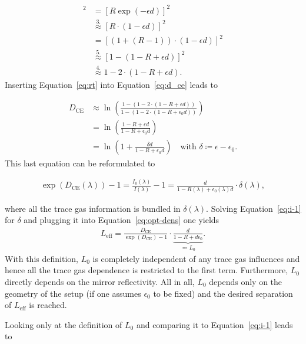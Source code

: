 \begin{align}
  [RT]^2 & = [R \exp(-\epsilon d)]^2 \nonumber\\
         & \stackrel{3.}{\approx} [R \cdot(1 - \epsilon d)]^2 \nonumber\\
         & = [(1 + (R - 1))\cdot (1 - \epsilon d)]^2 \nonumber\\
         & \stackrel{5.}{\approx} [1 - (1 - R + \epsilon d)]^2 \nonumber\\
         & \stackrel{4.}{\approx} 1 - 2 \cdot (1 - R + \epsilon d)\label{eq:rt}.
\end{align}
Inserting Equation~\eqref{eq:rt} into Equation~\eqref{eq:d_ce} leads to

\begin{align}
  D_{\text{CE}} & \approx \ln \left ( \frac{1 - (1 - 2\cdot ( 1- R +
  \epsilon d))}{1 - (1 - 2 \cdot (1 - R + \epsilon_0 d))}\right)\\
  & = \ln \left ( \frac{1 - R + \epsilon d}{1 - R + \epsilon_0
    d}\right) \\
  & = \ln \left ( 1 + \frac{ \delta d}{1 - R + \epsilon_0 d}\right) \quad
    \text{with } \delta \coloneqq \epsilon - \epsilon_0.
\end{align}
This last equation can be reformulated to

\begin{align}
  \exp(D_{\text{CE}}(\lambda)) - 1 = \frac{I_0(\lambda)}{I(\lambda)} -
  1 = \frac{d}{1 - R(\lambda) + \epsilon_0(\lambda) d} \cdot
  \delta(\lambda)\label{eq:i-1}, 
\end{align}

where all the trace gas information is bundled in
$\delta(\lambda)$. Solving Equation~\eqref{eq:i-1} for $\delta$ and
plugging it into Equation~\eqref{eq:opt-dens} one yields
\begin{align}
  L_{\text{eff}} = \frac{D_{\text{CE}}}{\exp(D_{\text{CE}}) - 1} \cdot
  \underbrace{\frac{d}{1 - R + d\epsilon_0}}_{\eqqcolon L_0}.
\end{align}
With this definition, $L_0$ is completely independent of any
trace gas influences and hence all the trace gas dependence is
restricted to the first term. Furthermore, $L_0$ directly depends on
the mirror reflectivity. All in all, $L_0$ depends only on the geometry
of the setup (if one assumes $\epsilon_0$ to be fixed) and the desired
separation of $L_{\text{eff}}$ is reached.

Looking only at the definition of $L_0$ and comparing it to
Equation~\eqref{eq:i-1} leads to

